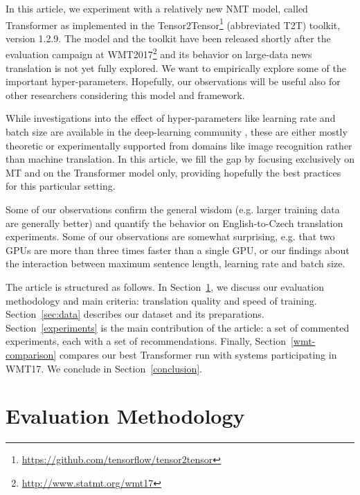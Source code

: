 \documentclass{pbmlarxiv} \pdfoutput=1
\def\footurl#1{\footnote{\url{#1}}}
\def\Sref#1{Section~\ref{#1}}
\begin{document}
In this article, we experiment with a relatively new NMT model, called Transformer
\citep{vaswani-et-al:2017} as implemented in the Tensor2Tensor\footurl{https://github.com/tensorflow/tensor2tensor} (abbreviated T2T) toolkit, version 1.2.9.
The model and the toolkit have been released shortly after the
evaluation campaign at WMT2017\footurl{http://www.statmt.org/wmt17} and its
behavior on large-data news translation is not yet fully explored.
We want to empirically explore some of the important hyper-parameters.
Hopefully, our observations will be useful also for other
researchers considering this model and framework.

While investigations into the effect of hyper-parameters
 like learning rate and batch size are available in the deep-learning community
 \citep[e.g.][]{bottou-et-al:2016,smith:le:generalization:2017,jastrzebski-et-al:2017},
 these are either mostly theoretic or experimentally supported
 from domains like image recognition rather than machine translation.
In this article, we fill the gap by focusing exclusively on MT
 and on the Transformer model only,
 providing hopefully the best practices for this particular setting.

Some of our observations confirm the general wisdom
 (e.g. larger training data are generally better)
 and quantify the behavior on English-to-Czech translation experiments.
Some of our observations are somewhat surprising,
 e.g. that two GPUs are more than three times faster than a single GPU,
 or our findings about the interaction between maximum sentence length, learning
 rate and batch size.

The article is structured as follows.
In \Sref{sec:eval}, we discuss our evaluation methodology and main criteria:
translation quality and speed of training.
\Sref{sec:data} describes our dataset and its preparations.
\Sref{experiments} is the main contribution of the article:
 a set of commented experiments, each with a set of recommendations. 
Finally, \Sref{wmt-comparison} compares our best Transformer run with systems participating in WMT17.
We conclude in \Sref{conclusion}.

\section{Evaluation Methodology}
\label{sec:eval}
\end{document}
